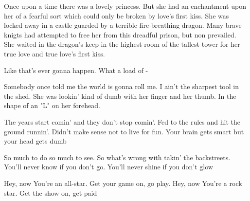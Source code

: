 \documentclass{article}
\begin{document}
Once upon a time there was a lovely princess.  But she had an enchantment upon her of a fearful sort which could only be broken by love's first kiss.  She was locked away in a castle guarded by a terrible fire-breathing dragon.  Many brave knigts had attempted to free her from this dreadful prison, but non prevailed.  She waited in the dragon's keep in the highest room of the tallest tower for her true love and true love's first kiss.

Like that's ever gonna happen.  What a load of - 

Somebody once told me the world is gonna roll me. I ain't the sharpest tool in the shed. She was lookin' kind of dumb with her finger and her thumb.  In the shape of an "L" on her forehead.

The years start comin' and they don't stop comin'. Fed to the rules and hit the ground runnin'.  Didn't make sense not to live for fun.  Your brain gets smart but your head gets dumb

So much to do so much to see. So what's wrong with takin' the backstreets.  You'll never know if you don't go.  You'll never shine if you don't glow 

Hey, now You're an all-star.  Get your game on, go play.  Hey, now You're a rock star.  Get the show on, get paid

\newpage
\onecolumn
\nocite{*}


\end{document}
